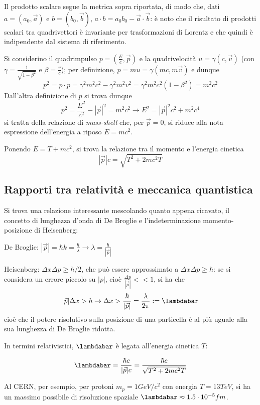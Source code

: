 Il prodotto scalare segue la metrica sopra riportata, di modo che, dati
$ a = (a_0,\vec{a})$ e $ b = (b_0,\vec{b}) $,  
$a\cdot b = a_0b_0 - \vec{a}\cdot\vec{b}$: è noto che il risultato di prodotti scalari
tra quadrivettori è invariante per trasformazioni di Lorentz e che quindi è
indipendente dal sistema di riferimento.
 
Si considerino il quadrimpulso $p = (\frac{E}{c},\vec{p})$ e la quadrivelocità
$u = \gamma(c,\vec{v})$ (con $ \gamma = \frac{1}{\sqrt{1-\beta^2}} $ e
$\beta = \frac{v}{c}$); per definizione, $p = mu = \gamma(mc,m\vec{v})$ e dunque
$$ p^2 = p\cdot p = \gamma^2m^2c^2 - \gamma^2m^2v^2 = \gamma^2m^2c^2(1-\beta^2) = m^2c^2 $$
Dall'altra definizione di $p$ si trova dunque
$$ p^2 = \frac{E^2}{c^2} - |\vec{p}|^2 = m^2c^2 \rightarrow E^2 = |\vec{p}|^2c^2 + m^2c^4$$
si tratta della relazione di \textit{mass-shell} che, per $\vec{p} = 0$, si riduce alla nota
espressione dell'energia a riposo $E = mc^2 $.

Ponendo $E = T + mc^2$, si trova la relazione tra il momento e l'energia cinetica
$$ |\vec{p}|c = \sqrt{T^2 + 2mc^2T} $$

\subsection{Rapporti tra relatività e meccanica quantistica}
Si trova una relazione interessante mescolando quanto appena ricavato, il concetto 
di lunghezza d'onda di De Broglie e l'indeterminazione momento-posizione di Heisenberg:

De Broglie: $ |\vec{p}| = \hbar k = \frac{\hbar}{\lambda} \rightarrow \lambda = \frac{\hbar}{|\vec{p}|}$

Heisenberg: $ \Delta x \Delta p \geq \hbar/ 2$, che può essere approssimato a
$ \Delta x \Delta p \geq \hbar$: se si considera un errore piccolo su $|p|$, cioè
$ \frac{\Delta p }{|\vec{p}|} << 1 $, si ha che
$$ |\vec{p}|\Delta x > \hbar \rightarrow \Delta x > \frac{\hbar}{|\vec{p}|} = \frac{\lambda}{2\pi} := \lambdabar$$ 
cioè che il potere risolutivo sulla posizione di una particella è al più uguale alla
sua lunghezza di De Broglie ridotta.

In termini relativistici, $\lambdabar$ è legata all'energia cinetica $T$:

$$\lambdabar = \frac{\hbar c}{|\vec{p}|c} = \frac{\hbar c}{\sqrt{T^2 + 2mc^2T}}$$

Al CERN, per esempio, per protoni $m_p = 1 GeV/c^2$ con energia $ T = 13TeV $, si ha
un massimo possibile di risoluzione spaziale $\lambdabar \approx 1.5 \cdot 10^{-5} fm$.

